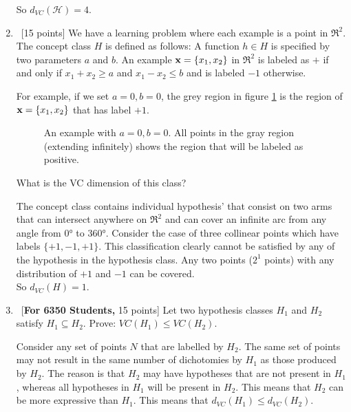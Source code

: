 \begin{enumerate}
So $d_{VC}(\mathcal{H}) = 4$.

\item ~[15 points] We have a learning problem where each example is a
  point in $\Re^2$. The concept class $H$ is defined as follows: A
  function $h \in H$ is specified by two parameters $a$ and $b$. An
  example ${\bf x} = \{x_1, x_2\}$ in $\Re^2$ is labeled as $+$ if and
  only if $x_1 + x_2 \geq a$ and $x_1 - x_2 \leq b$ and is labeled $-1$
  otherwise.

  For example, if we set $a = 0, b = 0$, the grey region in figure
  \ref{f1} is the region of ${\bf x} = \{x_1, x_2\}$ that has label
  $+1$.

  \begin{figure}[h!]
    \centering
    \caption{An example with $a = 0, b = 0$. All points in the gray region
      (extending infinitely) shows the region that will be labeled as
      positive.} \label{f1}
  \end{figure}



  What is the VC dimension of this class?

The concept class contains individual hypothesis' that consist on two arms that can intersect anywhere on $\Re^2$ and can cover an infinite arc from any angle from $0\si{\degree}$ to $360\si{\degree}$. Consider the case of three collinear points which have labels $\{+1, -1, +1\}$. This classification clearly cannot be satisfied by any of the hypothesis in the hypothesis class. Any two points ($2^1$ points) with any distribution of $+1$ and $-1$ can be covered.\\

So $d_{VC}(H) = 1$.

\item ~[{\bf For 6350 Students,} 15 points] Let two hypothesis classes
  $H_1$ and $H_2$ satisfy $H_1 \subseteq H_2$. Prove: $VC(H_1) \leq
  VC(H_2)$.

Consider any set of points $N$ that are labelled by $H_2$. The same set of points may not result in the same number of dichotomies by $H_1$ as those produced by $H_2$. The reason is that $H_2$ may have hypotheses that are not present in $H_1$, whereas all hypotheses in $H_1$ will be present in $H_2$. This means that $H_2$ can be more expressive than $H_1$. This means that $d_{VC}(H_1) \leq d_{VC}(H_2)$.

\end{enumerate}
